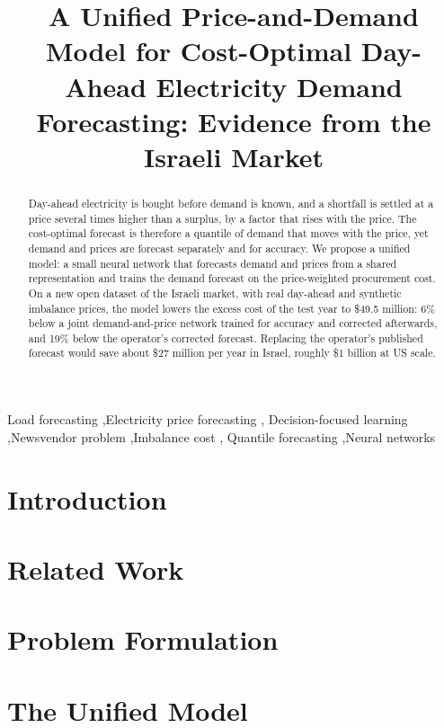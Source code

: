 \documentclass[preprint,12pt,authoryear,nonatbib]{elsarticle}
\begin{document}
\begin{frontmatter}

\title{A Unified Price-and-Demand Model for Cost-Optimal Day-Ahead
Electricity Demand Forecasting: Evidence from the Israeli Market}

\begin{abstract}
Day-ahead electricity is bought before demand is known, and a shortfall is
settled at a price several times higher than a surplus, by a factor that rises
with the price.  The cost-optimal forecast is therefore a quantile of demand
that moves with the price, yet demand and prices are forecast separately and
for accuracy.  We propose a unified model: a small neural network that
forecasts demand and prices from a shared representation and trains the
demand forecast on the price-weighted procurement cost.  On a new open dataset
of the Israeli market, with real day-ahead and synthetic imbalance prices,
the model lowers the excess cost of the test year to \$49.5 million: 6\%
below a joint demand-and-price network trained for accuracy and corrected
afterwards, and 19\% below the operator's corrected forecast.  Replacing the
operator's published forecast would save about \$27 million per year in
Israel, roughly \$1 billion at US scale.
\end{abstract}

\begin{keyword}
Load forecasting \sep Electricity price forecasting \sep
Decision-focused learning \sep Newsvendor problem \sep Imbalance cost \sep
Quantile forecasting \sep Neural networks
\end{keyword}

\end{frontmatter}

\section{Introduction}\label{sec:intro}


\section{Related Work}\label{sec:related}


\section{Problem Formulation}\label{sec:modeling}


\section{The Unified Model}\label{sec:architecture}

\clearpage  %
\end{document}
